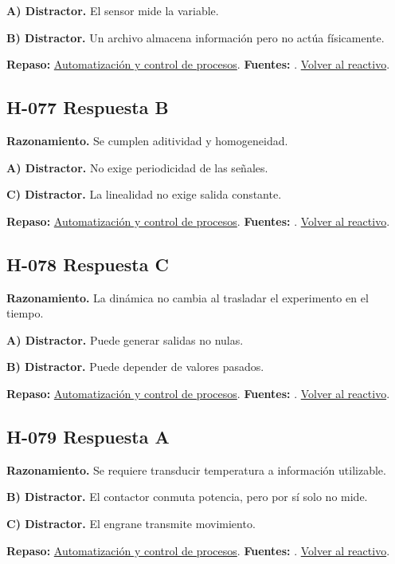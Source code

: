 \textbf{A) Distractor. }El sensor mide la variable.

\textbf{B) Distractor. }Un archivo almacena información pero no actúa físicamente.

\textbf{Repaso:} \hyperref[sec:h4]{Automatización y control de procesos}. \textbf{Fuentes:} \cite{control,signals,pid}. \hyperref[q:H-076]{Volver al reactivo}.\par\medskip

\subsection*{H-077 \quad Respuesta B}\label{s:H-077}
\textbf{Razonamiento.} Se cumplen aditividad y homogeneidad.

\textbf{A) Distractor. }No exige periodicidad de las señales.

\textbf{C) Distractor. }La linealidad no exige salida constante.

\textbf{Repaso:} \hyperref[sec:h4]{Automatización y control de procesos}. \textbf{Fuentes:} \cite{control,signals,pid}. \hyperref[q:H-077]{Volver al reactivo}.\par\medskip

\subsection*{H-078 \quad Respuesta C}\label{s:H-078}
\textbf{Razonamiento.} La dinámica no cambia al trasladar el experimento en el tiempo.

\textbf{A) Distractor. }Puede generar salidas no nulas.

\textbf{B) Distractor. }Puede depender de valores pasados.

\textbf{Repaso:} \hyperref[sec:h4]{Automatización y control de procesos}. \textbf{Fuentes:} \cite{control,signals,pid}. \hyperref[q:H-078]{Volver al reactivo}.\par\medskip

\subsection*{H-079 \quad Respuesta A}\label{s:H-079}
\textbf{Razonamiento.} Se requiere transducir temperatura a información utilizable.

\textbf{B) Distractor. }El contactor conmuta potencia, pero por sí solo no mide.

\textbf{C) Distractor. }El engrane transmite movimiento.

\textbf{Repaso:} \hyperref[sec:h4]{Automatización y control de procesos}. \textbf{Fuentes:} \cite{control,signals,pid}. \hyperref[q:H-079]{Volver al reactivo}.\par\medskip

